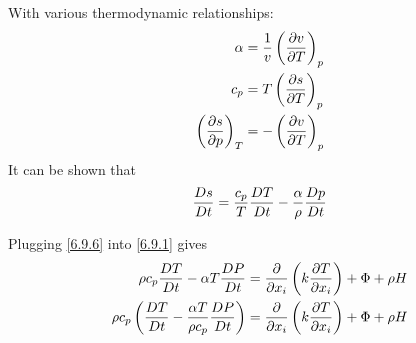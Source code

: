 \documentclass[document.tex]{subfiles}
\begin{document}
With various thermodynamic relationships: 
\begin{align}
    \alpha &= \frac{1}{v}\left(\pdv{v}{T}\right)_p \\
    c_p &= T\left(\pdv{s}{T}\right)_p \\
    \left(\pdv{s}{p}\right)_T &= -\left(\pdv{v}{T}\right)_p
\end{align}
It can be shown that 
\begin{align} \label{6.9.6}
    \frac{D s}{D t} = \frac{c_p}{T}\frac{D T}{D t} - \frac{\alpha}{\rho} \frac{D p}{D t}
\end{align}

Plugging \ref{6.9.6} into \ref{6.9.1} gives 
\begin{align} \label{6.9.7}
    \begin{split}
    \rho c_p \frac{D T}{D t} - \alpha T \frac{D P}{D t} &= \pdv{x_i} \left(k\pdv{T}{x_i}\right) + \Phi + \rho H \\
    \rho c_p \left(\frac{D T}{D t} - \frac{\alpha T}{\rho c_p} \frac{D P}{D t} \right) &=\pdv{x_i} \left(k\pdv{T}{x_i}\right) + \Phi + \rho H \\    
    \end{split}
\end{align}



\end{document}
